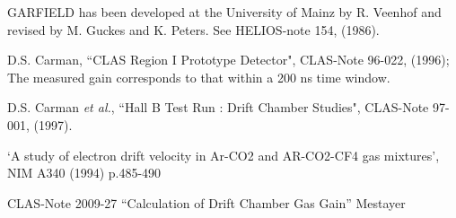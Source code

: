 \begin{thebibliography}{99}
GARFIELD has been developed at the University of Mainz by R. Veenhof and
revised by M. Guckes and K. Peters.  See HELIOS-note 154, (1986).

D.S. Carman, ``CLAS Region I Prototype Detector", CLAS-Note 96-022,
(1996); The measured gain corresponds to that within a 200 ns time window.

D.S. Carman {\it et al.}, ``Hall B Test Run : Drift Chamber Studies", CLAS-Note
97-001, (1997).

`A study of electron drift velocity in Ar-CO2 and AR-CO2-CF4 gas
mixtures', NIM A340 (1994) p.485-490

CLAS-Note 2009-27 ``Calculation of Drift Chamber Gas Gain'' Mestayer


\end{thebibliography}
